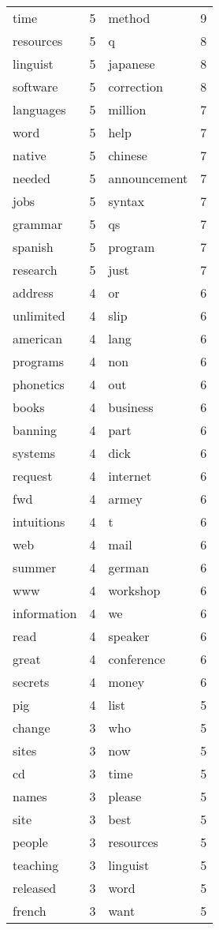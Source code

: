 \documentclass[10pt, a4paper]{article}
\begin{document}
\begin{longtable}{l c l c}
time & 5 & method & 9 \\
resources & 5 & q & 8 \\
linguist & 5 & japanese & 8 \\
software & 5 & correction & 8 \\
languages & 5 & million & 7 \\
word & 5 & help & 7 \\
native & 5 & chinese & 7 \\
needed & 5 & announcement & 7 \\
jobs & 5 & syntax & 7 \\
grammar & 5 & qs & 7 \\
spanish & 5 & program & 7 \\
research & 5 & just & 7 \\
address & 4 & or & 6 \\
unlimited & 4 & slip & 6 \\
american & 4 & lang & 6 \\
programs & 4 & non & 6 \\
phonetics & 4 & out & 6 \\
books & 4 & business & 6 \\
banning & 4 & part & 6 \\
systems & 4 & dick & 6 \\
request & 4 & internet & 6 \\
fwd & 4 & armey & 6 \\
intuitions & 4 & t & 6 \\
web & 4 & mail & 6 \\
summer & 4 & german & 6 \\
www & 4 & workshop & 6 \\
information & 4 & we & 6 \\
read & 4 & speaker & 6 \\
great & 4 & conference & 6 \\
secrets & 4 & money & 6 \\
pig & 4 & list & 5 \\
change & 3 & who & 5 \\
sites & 3 & now & 5 \\
cd & 3 & time & 5 \\
names & 3 & please & 5 \\
site & 3 & best & 5 \\
people & 3 & resources & 5 \\
teaching & 3 & linguist & 5 \\
released & 3 & word & 5 \\
french & 3 & want & 5 \\

\end{longtable}
\end{document}
